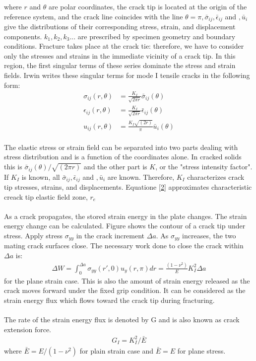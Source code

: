 \documentclass[11pt]{article}
\begin{document}
where $r$ and $\theta$ are polar coordinates, the crack tip is located at the origin of the reference system, and
the crack line coincides with the line $\theta = \pi, \bar{\sigma}_{ij}, \bar{\epsilon}_{ij}$ and $, \bar{u}_{i}$ give the distributions of their corresponding 
stress, strain, and displacement components. $k_1, k_2, k_3. . .$ are 
prescribed by specimen geometry and boundary conditions.
Fracture takes place at the crack tie: therefore, we have 
to consider only the stresses and strains in the immediate 
vicinity of a crack tip. In this region, the first singular terms of 
these series dominate the stress and strain fields. Irwin writes these singular 
terms for mode I tensile cracks in the following form:
\begin{align*} 
    \sigma_{ij}(r, \theta) &= \frac{K_I}{\sqrt{2 \pi r}} \bar{\sigma}_{ij}(\theta) 
    \\\epsilon_{ij}(r, \theta) &= \frac{K_I}{\sqrt{2 \pi r}} \bar{\epsilon}_{ij}(\theta) \tag{2} \label{2}
    \\u_{ij}(r, \theta) &= \frac{K_I \sqrt{(2 r)}}{\pi} \bar{u}_{i}(\theta)
\end{align*}
\\The elastic stress or strain field can be separated into two parts dealing with stress distribution and is a function of the coordinates alone.
 In cracked solids this is $\bar{\sigma}_{ij}(\theta)/\sqrt{(2 \pi r)}$ and 
 the other part is $K$, or the "stress intensity factor".
If $K_I$ is known, all $\bar{\sigma}_{ij}, \bar{\epsilon}_{ij}$ and $, \bar{u}_{i}$ are known. Therefore, 
$K_I$ characterizes crack tip stresses, strains, and displacements.
Equatione \eqref{2} approximates characteristic creack tip elastic field zone, $r_e$
\\\\As a crack propagates, the stored strain energy in the plate changes. The strain energy change can be
calculated. Figure shows the contour of a crack tip under stress. Apply stress $\sigma_{yy}$ in the crack
increment $\Delta a$. As $\sigma_{yy}$ increases, the two mating crack surfaces close. The necessary work done to close
the crack within $\Delta a$ is:
\begin{align*}
    \Delta W = \int_{0}^{\Delta a} \sigma_{yy}(r', 0)u_y(r, \pi)dr = \frac{(1 - \nu ^ 2)}{E} K_{I}^2 \Delta a \tag{3} \label{3}
\end{align*}
for the plane strain case. This is also the amount of strain energy released as the crack moves forward
under the fixed grip condition. It can be considered as the strain energy flux which flows toward the
crack tip during fracturing.
\\\\The rate of the strain energy flux is denoted by G and is also known as crack extension force.
\begin{align*}
    G_I = K_{I}^{2}/\bar{E} \tag{4} \label{4}
\end{align*}
where $\bar E = E/(1 - \nu^2)$ for plain strain case and $\bar{E} = E$ for plane stress.
\end{document}

